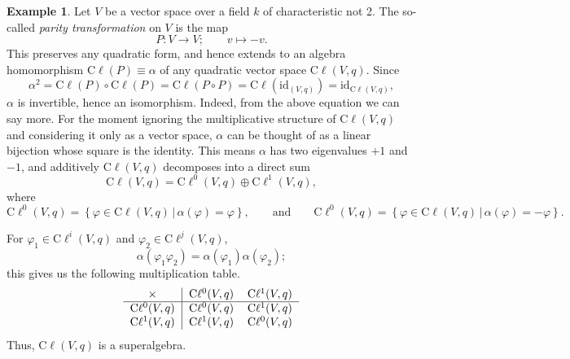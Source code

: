 \documentclass[a4paper,10pt]{scrreprt}
\newcommand{\cliff}{\mathrm{C}\ell}
\theoremstyle{definition}
\newtheorem{example}{Example}[section]
\theoremstyle{plain}
\theoremstyle{remark}
\begin{document}
\begin{example}
  Let $V$ be a vector space over a field $k$ of characteristic not 2. The so-called \emph{parity transformation} on $V$ is the map
  \begin{equation*}
    P\colon V \to V;\qquad v \mapsto -v.
  \end{equation*}
  This preserves any quadratic form, and hence extends to an algebra homomorphism $\cliff(P) \equiv \alpha$ of any quadratic vector space $\cliff(V,q)$. Since 
  \begin{equation*}
    \alpha^2 = \cliff(P) \circ \cliff(P) = \cliff(P \circ P) = \cliff(\mathrm{id}_{(V,q)}) = \mathrm{id}_{\cliff(V,q)},
  \end{equation*}
  $\alpha$ is invertible, hence an isomorphism. Indeed, from the above equation we can say more. For the moment ignoring the multiplicative structure of $\cliff(V,q)$ and considering it only as a vector space, $\alpha$ can be thought of as a linear bijection whose square is the identity. This means $\alpha$ has two eigenvalues $+1$ and $-1$, and additively $\cliff(V,q)$ decomposes into a direct sum
  \begin{equation*}
    \cliff(V,q) = \cliff^{0}(V,q) \oplus \cliff^{1}(V,q),
  \end{equation*}
  where 
  \begin{equation*}
    \cliff^{0}(V,q) = \left\{ \varphi \in \cliff(V,q)\,\big|\, \alpha(\varphi) = \varphi \right\},\qquad\text{and} \qquad\cliff^{0}(V,q) = \left\{ \varphi \in \cliff(V,q)\,\big|\, \alpha(\varphi) = -\varphi \right\}.
  \end{equation*}

  For $\varphi_{1} \in \cliff^{i}(V,q)$ and $\varphi_{2} \in \cliff^{j}(V,q)$,
  \begin{equation*}
    \alpha(\varphi_{1}\varphi_{2}) = \alpha(\varphi_{1})\alpha(\varphi_{2});
  \end{equation*}
  this gives us the following multiplication table.
  \begin{equation*}
    \begin{tabular}[c]{c | c c}
      $\times$ & $\cliff^{0}(V,q)$ & $\cliff^{1}(V,q)$ \\
      \hline
      $\cliff^{0}(V,q)$ & $\cliff^{0}(V,q)$ & $\cliff^{1}(V,q)$\\
      $\cliff^{1}(V,q)$ & $\cliff^{1}(V,q)$ & $\cliff^{0}(V,q)$\\
    \end{tabular}
  \end{equation*}
  Thus, $\cliff(V,q)$ is a superalgebra.

\end{example}
\end{document}
